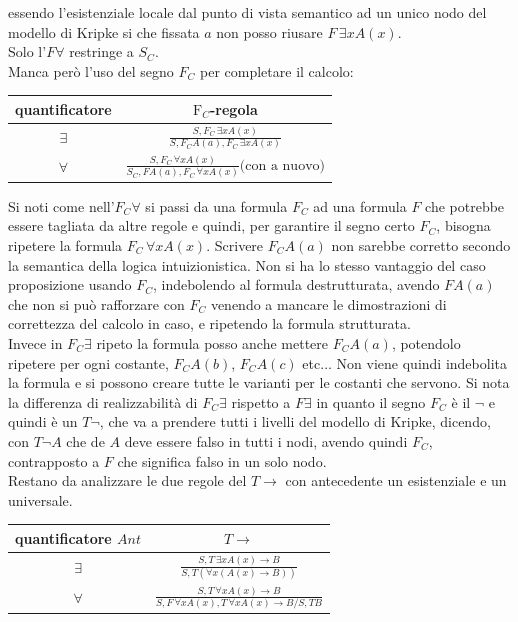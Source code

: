 \documentclass[a4paper,12pt, oneside]{book}
\begin{document}
essendo l'esistenziale locale dal punto di vista semantico ad un unico nodo del
modello di Kripke si che fissata $a$ non posso riusare $F\,\exists x A(x)$.\\
Solo l'$F\forall$ restringe a $S_C$.\\
Manca però l'uso del segno $F_C$ per completare il calcolo:
\begin{table}[H]
  \centering
  \Large
  \begin{tabular}{c||c}
    quantificatore & $\mbox{F}_C$-regola\\
    \hline
    $\exists$ & $\frac{S,F_C\,\exists x A(x)}{S,F_CA(a),F_C\,\exists x A(x)}$\\
    \hline
    $\forall$ & $\frac{S,F_C\,\forall x A(x)}{S_C,FA(a), F_C\,\forall xA(x)}
                \mbox{(con a nuovo)}$
  \end{tabular}
\end{table}
Si noti come nell'$F_C\forall$ si passi da una formula $F_C$ ad una formula $F$
che potrebbe essere tagliata da altre regole e quindi, per garantire il 
segno certo $F_C$, bisogna ripetere la formula $F_C\,\forall x A(x)$. Scrivere
$F_CA(a)$ non sarebbe corretto secondo la semantica della logica
intuizionistica. Non si ha lo stesso vantaggio del caso proposizione usando
$F_C$, indebolendo al formula destrutturata, avendo $FA(a)$ che non si può
rafforzare con $F_C$ venendo a mancare le dimostrazioni di correttezza del
calcolo in caso, e ripetendo la formula strutturata.\\
Invece in $F_C\exists$ ripeto la formula posso anche mettere $F_CA(a)$,
potendolo ripetere per ogni costante, $F_CA(b)$, $F_CA(c)$ etc$\ldots$ Non viene
quindi indebolita la formula e si possono creare tutte le varianti per le
costanti che servono. Si nota la differenza di realizzabilità di $F_C\exists$
rispetto a $F\exists$ in quanto il segno $F_C$ è il $\neg$ e quindi è un
$T\neg$, che va a prendere tutti i livelli del modello di Kripke, dicendo, con
$T\neg A$ che de $A$ deve essere falso in tutti i nodi, avendo quindi $F_C$,
contrapposto a $F$ che significa falso in un solo nodo.\\
Restano da analizzare le due regole del $T\to$ con antecedente un esistenziale e
un universale.
\begin{table}[H]
  \centering
  \Large
  \begin{tabular}{c||c}
    quantificatore $Ant$ & $T\to$\\
    \hline
    $\exists$ & $\frac{S,T\,\exists x A(x)\to B}{S,T(\forall x(A(x)\to B))}$\\
    \hline
    $\forall$ & $\frac{S,T\,\forall x A(x)\to B}{S,F\,\forall xA(x),T\,\forall
                xA(x)\to B/ S, TB}$
  \end{tabular}
\end{table}
\end{document}
